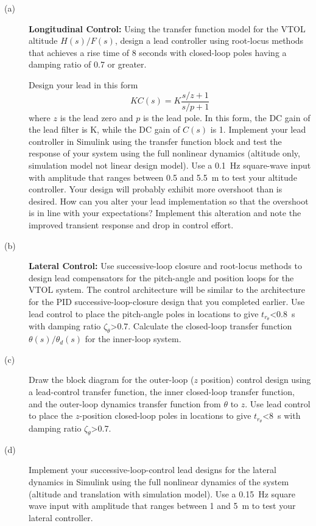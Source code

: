 \begin{description} \item[]
\item[(a)] {\bf Longitudinal Control:} Using the transfer function model for the VTOL altitude $H(s)/F(s)$, design a lead controller using root-locus methods that achieves a rise time of 8 seconds with closed-loop poles having a damping ratio of 0.7 or greater.

	Design your lead in this form
	\[
		KC(s) = K \frac{s/z +1}{s/p+1}
	\]
	where $z$ is the lead zero and $p$ is the lead pole. In this form, the DC gain of the lead filter is K, while the DC gain of $C(s)$ is 1. Implement your lead controller in Simulink using the transfer function block and test the response of your system using the full nonlinear dynamics (altitude only, simulation model not linear design model). Use a 0.1~Hz square-wave input with amplitude that ranges between 0.5 and 5.5~m to test your altitude controller.
	Your design will probably exhibit more overshoot than is desired. How can you alter your lead implementation so that the overshoot is in line with your expectations? Implement this alteration and note the improved transient response and drop in control effort.

\item[(b)] {\bf Lateral Control:} Use successive-loop closure and root-locus methods to design lead compensators for the pitch-angle and position loops for the VTOL system. The control architecture will be similar to the architecture for the PID successive-loop-closure design that you completed earlier. Use lead control to place the pitch-angle poles in locations to give $t_{r_\theta}$<0.8~s with damping ratio $\zeta_{\theta}$>0.7. Calculate the closed-loop transfer function $\theta(s)/\theta_d(s)$ for the inner-loop system.

\item[(c)] Draw the block diagram for the outer-loop ($z$ position) control design using a lead-control transfer function, the inner closed-loop transfer function, and the outer-loop dynamics transfer function from $\theta$ to $z$. Use lead control to place the $z$-position closed-loop poles in locations to give $t_{r_\theta}$<8~s with damping ratio $\zeta_{\theta}$>0.7.

\item[(d)] Implement your successive-loop-control lead designs for the lateral dynamics in Simulink using the full nonlinear dynamics of the system (altitude and translation with simulation model). Use a 0.15~Hz square wave input with amplitude that ranges between 1 and 5~m to test your lateral controller.

\end{description}
